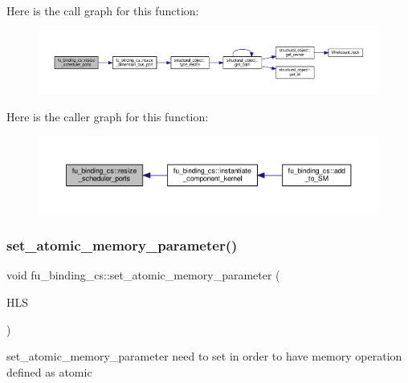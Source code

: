 Here is the call graph for this function\+:
\nopagebreak
\begin{figure}[H]
\begin{center}
\leavevmode
\includegraphics[width=350pt]{d4/d7b/classfu__binding__cs_a747378042d84416750cd1835d80aaa13_cgraph}
\end{center}
\end{figure}
Here is the caller graph for this function\+:
\nopagebreak
\begin{figure}[H]
\begin{center}
\leavevmode
\includegraphics[width=350pt]{d4/d7b/classfu__binding__cs_a747378042d84416750cd1835d80aaa13_icgraph}
\end{center}
\end{figure}
\mbox{\label{classfu__binding__cs_aa672ceff5ca96fa5fe84ae1582469b85}} 
\subsubsection{\texorpdfstring{set\+\_\+atomic\+\_\+memory\+\_\+parameter()}{set\_atomic\_memory\_parameter()}}
{\footnotesize\ttfamily void fu\+\_\+binding\+\_\+cs\+::set\+\_\+atomic\+\_\+memory\+\_\+parameter (\begin{DoxyParamCaption}\item[{const \hyperlink{hls_8hpp_a75d0c73923d0ddfa28c4843a802c73a7}{hls\+Ref}}]{H\+LS }\end{DoxyParamCaption})\hspace{0.3cm}{\ttfamily [protected]}}



set\+\_\+atomic\+\_\+memory\+\_\+parameter need to set in order to have memory operation defined as atomic 


